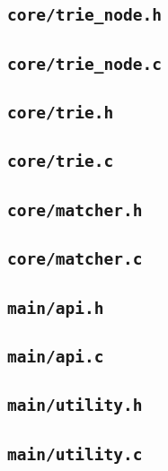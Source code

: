 \documentclass[../main.tex]{subfiles}
\begin{document}
\subsection{\texttt{core/trie\_node.h}}


\subsection{\texttt{core/trie\_node.c}}


\subsection{\texttt{core/trie.h}}


\subsection{\texttt{core/trie.c}}


\subsection{\texttt{core/matcher.h}}


\subsection{\texttt{core/matcher.c}}


\subsection{\texttt{main/api.h}}


\subsection{\texttt{main/api.c}}


\subsection{\texttt{main/utility.h}}


\subsection{\texttt{main/utility.c}}

\end{document}
